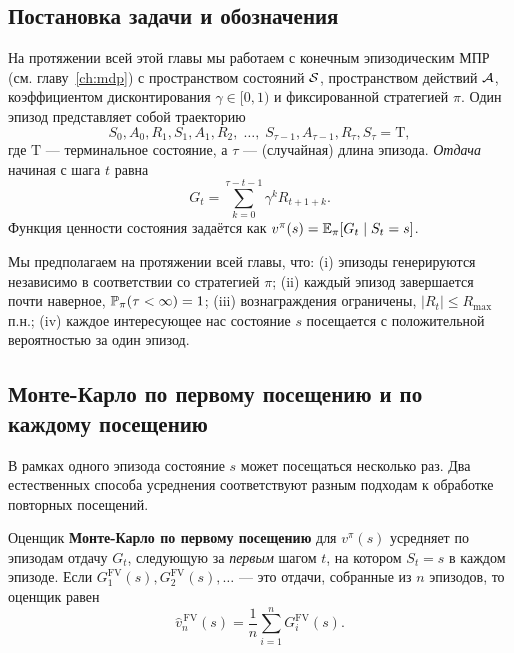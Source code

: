 \subsection*{Постановка задачи и обозначения}

На протяжении всей этой главы мы работаем с конечным эпизодическим МПР (см. главу~\ref{ch:mdp}) с пространством состояний $\mathcal{S}$, пространством действий $\mathcal{A}$, коэффициентом дисконтирования $\gamma \in [0,1)$ и фиксированной стратегией $\pi$.  Один эпизод представляет собой траекторию
\[
  S_0, A_0, R_1, S_1, A_1, R_2, \;\dots,\; S_{\tau-1}, A_{\tau-1}, R_{\tau}, S_{\tau} = \mathrm{T},
\]
где $\mathrm{T}$ --- терминальное состояние, а $\tau$ --- (случайная) длина эпизода.  \emph{Отдача} начиная с шага $t$ равна
\begin{equation}
  \label{eq:mc-return}
  G_t = \sum_{k=0}^{\tau - t - 1} \gamma^k R_{t+1+k}.
\end{equation}
Функция ценности состояния задаётся как $v^{\pi}(s) = \operatorname{\mathbb{E}}_\pi[G_t \mid S_t = s]$.

Мы предполагаем на протяжении всей главы, что: (i) эпизоды генерируются независимо в соответствии со стратегией $\pi$; (ii) каждый эпизод завершается почти наверное, $\mathbb{P}_\pi(\tau < \infty) = 1$; (iii) вознаграждения ограничены, $|R_t| \le R_{\max}$ п.н.; (iv) каждое интересующее нас состояние $s$ посещается с положительной вероятностью за один эпизод.

\subsection*{Монте-Карло по первому посещению и по каждому посещению}

В рамках одного эпизода состояние $s$ может посещаться несколько раз.  Два естественных способа усреднения соответствуют разным подходам к обработке повторных посещений.

\begin{definition}
\label{def:first-visit-mc}
Оценщик \textbf{Монте-Карло по первому посещению} для $v^\pi(s)$ усредняет по эпизодам отдачу $G_t$, следующую за \emph{первым} шагом $t$, на котором $S_t = s$ в каждом эпизоде.  Если $G_1^{\mathrm{FV}}(s), G_2^{\mathrm{FV}}(s), \dots$ --- это отдачи, собранные из $n$ эпизодов, то оценщик равен
\begin{equation}
  \label{eq:fv-estimator}
  \widehat{v}_n^{\,\mathrm{FV}}(s) = \frac{1}{n} \sum_{i=1}^{n} G_i^{\mathrm{FV}}(s).
\end{equation}
\end{definition}

